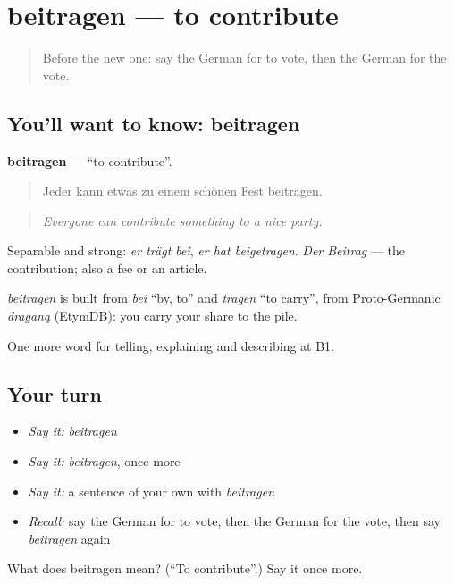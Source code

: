 \section[beitragen]{beitragen — to contribute}

\label{lesson:GE-C358-beitragen}



\begin{quote}
Before the new one: say the German for to vote, then the German for the vote.
\end{quote}

\subsection*{You'll want to know: beitragen}
\textbf{beitragen} — \textquotedblleft{}to contribute\textquotedblright{}.

\begin{quote}
Jeder kann etwas zu einem schönen Fest beitragen.
\end{quote}

\begin{quote}
\emph{Everyone can contribute something to a nice party.}
\end{quote}

Separable and strong: \emph{er trägt bei}, \emph{er hat beigetragen}. \emph{Der Beitrag} — the contribution; also a fee or an article.

\begin{cousinweb}
\emph{beitragen} is built from \emph{bei} \textquotedblleft{}by, to\textquotedblright{} and \emph{tragen} \textquotedblleft{}to carry\textquotedblright{}, from Proto-Germanic \emph{draganą} (EtymDB): you carry your share to the pile.
\end{cousinweb}

\begin{grammarlens}[title={What you've built}]
One more word for telling, explaining and describing at B1.
\end{grammarlens}

\subsection*{Your turn}
\begin{itemize}
\raggedright
  \item \emph{Say it:} \emph{beitragen}
  \item \emph{Say it:} \emph{beitragen}, once more
  \item \emph{Say it:} a sentence of your own with \emph{beitragen}
  \item \emph{Recall:} say the German for to vote, then the German for the vote, then say \emph{beitragen} again
\end{itemize}

\begin{tcolorbox}[breakable,colback=teal!4,colframe=teal!35!black,title={Before you move on}]
What does beitragen mean? (\textquotedblleft{}To contribute\textquotedblright{}.) Say it once more.
\end{tcolorbox}
